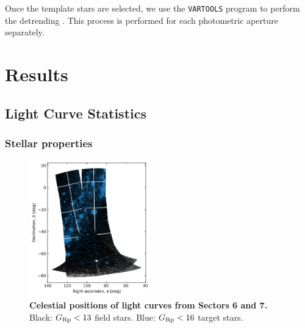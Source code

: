 \documentclass[12pt,twocolumn,tighten]{aastex62}
\begin{document}
Once the template stars are selected, we use the \texttt{VARTOOLS}
program to perform the detrending \citep{Hartman_Bakos_2016}.
This process is performed for each photometric aperture
separately.


\section{Results}
\label{sec:results}



\subsection{Light Curve Statistics}
\label{subsec:lcstatistics}

\subsubsection{Stellar properties}

\begin{figure}[!t]
	\begin{center}
		\leavevmode
		\includegraphics[width=0.47\textwidth]{cluster_field_star_positions.png}
	\end{center}
	\vspace{-0.5cm}
	\caption{
		{\bf Celestial positions of light curves from Sectors 6
			and 7.}  Black: $G_{\rm Rp}<13$ field stars.  Blue: $G_{\rm
			Rp}<16$ target stars.
		\label{fig:lcradec}
	}
\end{figure}
\end{document}
